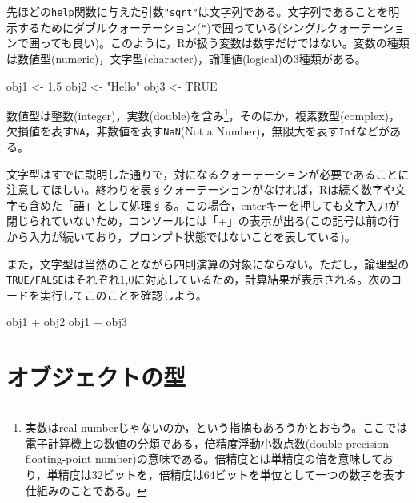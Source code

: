 \documentclass[
  a4paper,
]{ltjsbook}
\newenvironment{Shaded}{\begin{snugshade}}{\end{snugshade}}
\newcommand{\ConstantTok}[1]{\textcolor[rgb]{0.56,0.35,0.01}{#1}}
\newcommand{\FloatTok}[1]{\textcolor[rgb]{0.68,0.00,0.00}{#1}}
\newcommand{\NormalTok}[1]{\textcolor[rgb]{0.00,0.23,0.31}{#1}}
\newcommand{\OtherTok}[1]{\textcolor[rgb]{0.00,0.23,0.31}{#1}}
\newcommand{\SpecialCharTok}[1]{\textcolor[rgb]{0.37,0.37,0.37}{#1}}
\newcommand{\StringTok}[1]{\textcolor[rgb]{0.13,0.47,0.30}{#1}}
\begin{document}
先ほどの\texttt{help}関数に与えた引数\texttt{"sqrt"}は文字列である。文字列であることを明示するためにダブルクォーテーション(\texttt{"})で囲っている(シングルクォーテーションで囲っても良い)。このように，Rが扱う変数は数字だけではない。変数の種類は数値型(numeric)，文字型(character)，論理値(logical)の3種類がある。

\begin{Shaded}
\begin{Highlighting}[]
\NormalTok{obj1 }\OtherTok{\textless{}{-}} \FloatTok{1.5}
\NormalTok{obj2 }\OtherTok{\textless{}{-}} \StringTok{"Hello"}
\NormalTok{obj3 }\OtherTok{\textless{}{-}} \ConstantTok{TRUE}
\end{Highlighting}
\end{Shaded}

数値型は整数(integer)，実数(double)を含み\footnote{実数はreal
  numberじゃないのか，という指摘もあろうかとおもう。ここでは電子計算機上の数値の分類である，倍精度浮動小数点数(double-precision
  floating-point
  number)の意味である。倍精度とは単精度の倍を意味しており，単精度は32ビットを，倍精度は64ビットを単位として一つの数字を表す仕組みのことである。}，そのほか，複素数型(complex)，欠損値を表す\texttt{NA}，非数値を表す\texttt{NaN}(Not
a Number)，無限大を表す\texttt{Inf}などがある。

文字型はすでに説明した通りで，対になるクォーテーションが必要であることに注意してほしい。終わりを表すクォーテーションがなければ，Rは続く数字や文字も含めた「語」として処理する。この場合，enterキーを押しても文字入力が閉じられていないため，コンソールには「+」の表示が出る(この記号は前の行から入力が続いており，プロンプト状態ではないことを表している)。

また，文字型は当然のことながら四則演算の対象にならない。ただし，論理型の\texttt{TRUE/FALSE}はそれぞれ1,0に対応しているため，計算結果が表示される。次のコードを実行してこのことを確認しよう。

\begin{Shaded}
\begin{Highlighting}[]
\NormalTok{obj1 }\SpecialCharTok{+}\NormalTok{ obj2}
\NormalTok{obj1 }\SpecialCharTok{+}\NormalTok{ obj3}
\end{Highlighting}
\end{Shaded}

\section{オブジェクトの型}\label{ux30aaux30d6ux30b8ux30a7ux30afux30c8ux306eux578b}
\end{document}
